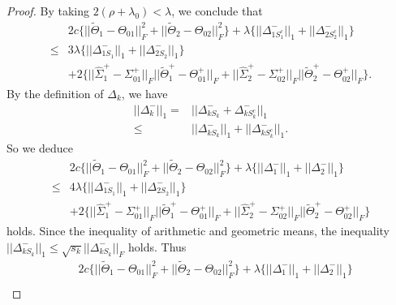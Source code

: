 \documentclass[review]{elsarticle}
\newcommand{\1}{{\bf 1}}
\newcommand{\0}{{\bf 0}}
\newtheorem{proof}{Proof}
\begin{document}
\begin{appendices}
\begin{proof}
 By taking $2(\rho+\lambda_0)<\lambda$, we conclude that
\begin{equation}
\begin{split}
&2c\Big\{||\widetilde{\Theta}_1-\Theta_{01}||_{F}^{2}+||\widetilde{\Theta}_2-\Theta_{02}||_{F}^{2}\Big\}
+\lambda\Big\{||\Delta_{1S_1^{c}}^{-}||_1+||\Delta_{2S_2^{c}}^{-}||_1\Big\}\\
\leq &3\lambda\Big\{||\Delta_{1S_1}^{-}||_1+||\Delta_{2S_2}^{-}||_1\Big\}\\
&+2\Big\{||\widehat{\Sigma}_{1}^{+}-\Sigma_{01}^{+}||_F||\widetilde{\Theta}_1^{+}-\Theta_{01}^{+}||_{F}
+||\widehat{\Sigma}_{2}^{+}-\Sigma_{02}^{+}||_F||\widetilde{\Theta}_2^{+}-\Theta_{02}^{+}||_{F}\Big\}.
\end{split}
\end{equation}
 By the definition of $\Delta_k$, we have
\begin{equation}\label{equal_35}
\begin{split}
||\Delta_k^{-}||_1=&||\Delta_{kS_{k}}^{-}+\Delta_{kS_{k}^c}^{-}||_1\\
\leq& ||\Delta_{kS_{k}}^{-}||_1+||\Delta_{kS_{k}^c}^{-}||_1.
\end{split}
\end{equation}
 So we deduce
\begin{equation}
\begin{split}
&2c\Big\{||\widetilde{\Theta}_1-\Theta_{01}||_{F}^{2}+||\widetilde{\Theta}_2-\Theta_{02}||_{F}^{2}\Big\}
+\lambda\Big\{||\Delta_{1}^{-}||_1+||\Delta_{2}^{-}||_1\Big\}\\
\leq &4\lambda\Big\{||\Delta_{1S_1}^{-}||_1+||\Delta_{2S_2}^{-}||_1\Big\}\\
&+2\Big\{||\widehat{\Sigma}_{1}^{+}-\Sigma_{01}^{+}||_F||\widetilde{\Theta}_1^{+}-\Theta_{01}^{+}||_{F}
+||\widehat{\Sigma}_{2}^{+}-\Sigma_{02}^{+}||_F||\widetilde{\Theta}_2^{+}-\Theta_{02}^{+}||_{F}\Big\}
\end{split}
\end{equation}
 holds.
 Since the inequality of arithmetic and geometric means,
 the inequality $||\Delta_{kS_k}^{-}||_1\leq \sqrt{s_k}||\Delta_{kS_k}^{-}||_{F}$ holds. Thus
\begin{equation}\label{lasine}
\begin{split}
&2c\Big\{||\widetilde{\Theta}_1-\Theta_{01}||_{F}^{2}+||\widetilde{\Theta}_2-\Theta_{02}||_{F}^{2}\Big\}
+\lambda\Big\{||\Delta_{1}^{-}||_1+||\Delta_{2}^{-}||_1\Big\}\\

\end{split}
\end{equation}
\end{proof}
\end{appendices}
\end{document}
